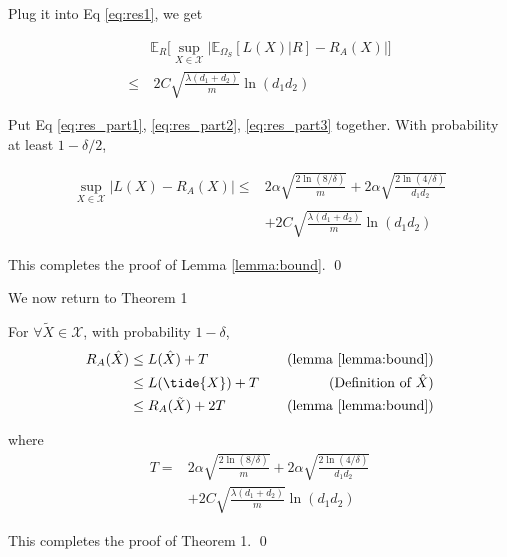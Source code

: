 \documentclass{article}
\numberwithin{equation}{section}
\newcommand{\supX}{\sup_{X \in \mathcal{X}}}
\newtheorem{sampling strategy}{Sampling Strategy}
\begin{document}
Plug it into Eq \ref{eq:res1}, we get 

\begin{equation}
    \begin{aligned}
    & \mathbb{E}_R \Big[ \sup_{X \in \mathcal{X}} \big|\mathbb{E}_{\Omega_S} [L(X) | R] - R_A(X) \big| \Big] \nonumber \\
    \leq &~ 2 C \sqrt{\frac{\lambda (d_1 + d_2)}{m}} \ln(d_1 d_2) \label{eq:res_part3}
    \end{aligned}
\end{equation}

Put Eq \ref{eq:res_part1}, \ref{eq:res_part2}, \ref{eq:res_part3} together. With probability at least $1 - \delta /2$,

\begin{equation}
    \begin{aligned}
        \supX |L(X) - R_A(X)| \leq & 2 \alpha \sqrt{\frac{2\ln(8/\delta)}{m}} + 2\alpha \sqrt{ \frac{2\ln(4/\delta) }{d_1 d_2} } \\
        & + 2 C \sqrt{\frac{\lambda (d_1 + d_2)}{m}} \ln(d_1 d_2)
    \end{aligned}
\end{equation}

This completes the proof of Lemma \ref{lemma:bound}.
\qed 

We now return to Theorem 1 %

For $\forall \tilde{X} \in \mathcal{X}$, with probability $1 - \delta$,
\begin{equation}
    \begin{aligned}
        R_A(\hat{X}) & \leq L(\hat{X}) + T &~~~\text{(lemma \ref{lemma:bound})} \\
        & \leq L(\tide{X}) + T &\text{(Definition of $\hat{X}$)} \\
        & \leq R_A(\tilde{X}) + 2T  &\text{(lemma \ref{lemma:bound})} \nonumber    
    \end{aligned}
\end{equation}

where
\begin{align}
    T = & 2 \alpha \sqrt{\frac{2\ln(8/\delta)}{m}} + 2\alpha \sqrt{ \frac{2\ln(4/\delta) }{d_1 d_2} } \nonumber \\
        & + 2 C \sqrt{\frac{\lambda(d_1 + d_2)}{m}} \ln(d_1 d_2) \nonumber
\end{align}


This completes the proof of Theorem 1. \qed 

\end{document}
